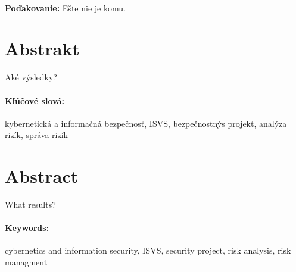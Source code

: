 \documentclass[12pt, twoside]{book}
\begin{document}
\newpage 
\pagestyle{plain}
~

\vfill
{\bf Poďakovanie:} Ešte nie je komu.


\newpage 
\section*{Abstrakt}

Aké výsledky?

\paragraph*{Kľúčové slová:} 
kybernetická a informačná bezpečnosť,
ISVS,
bezpečnostnýs projekt,
analýza rizík,
správa rizík


\newpage 
\section*{Abstract}

What results?

\paragraph*{Keywords:} 
cybernetics and information security,
ISVS,
security project,
risk analysis,
risk managment




\cleardoublepage
\tableofcontents



\newpage 

\listoffigures
\listoftables


\mainmatter
\pagestyle{headings}








\end{document}
